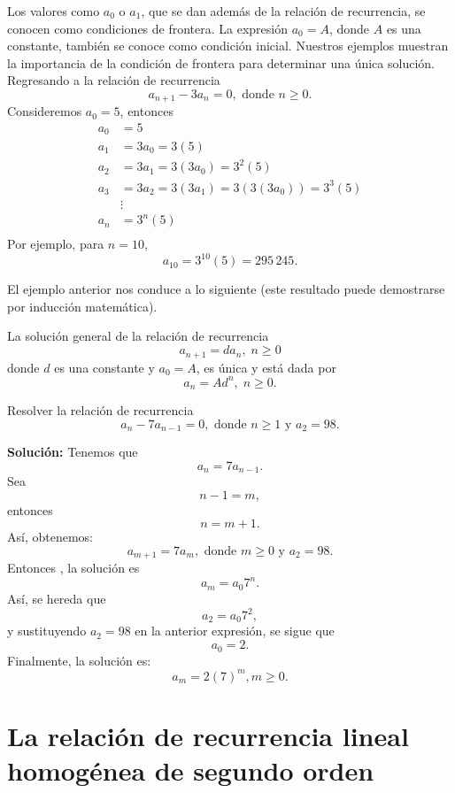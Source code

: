 Los valores como $a_0$ o $a_1$, que se dan además de la relación de recurrencia, se conocen como condiciones de frontera. La expresión $a_0 = A$, donde $A$ es una constante, también se conoce como condición inicial. Nuestros ejemplos muestran la importancia de la condición de frontera para determinar una única solución. \\

Regresando a la relación de recurrencia
$$a_{n+1} - 3a_n = 0, \text{ donde } n \geq 0.$$
Consideremos $a_0 = 5$, entonces
\begin{align*}
    a_0 & = 5 \\
    a_1 & = 3a_0 = 3(5) \\
    a_2 & = 3a_1 = 3(3a_0) = 3^2 (5) \\
    a_3 & = 3a_2 = 3(3a_1) = 3(3(3a_0)) = 3^{3} (5) \\
    & \vdots \\
    a_n & = 3^{n} (5) \\
\end{align*}
Por ejemplo, para $n = 10$,
$$a_{10} = 3^{10}(5) = 295 \, 245.$$

El ejemplo anterior nos conduce a lo siguiente (este resultado puede demostrarse por inducción matemática).

\begin{BOX}
    La solución general de la relación de recurrencia
    $$a_{n+1} = da_n, \; n \geq 0$$
    donde $d$ es una constante y $a_0 = A$, es única y está dada por
    $$a_n = Ad^n, \; n \geq 0.$$
\end{BOX}

\begin{myexample}
    Resolver la relación de recurrencia
    $$a_n - 7a_{n-1} = 0, \text{ donde } n \geq 1 \text{ y } a_2 = 98.$$

    \tcblower
    \textbf{\color{jblueleft}Solución:} Tenemos que
    $$a_n = 7a_{n-1}.$$
    Sea
    $$n - 1 = m,$$
    entonces
    $$n = m + 1.$$
    Así, obtenemos:
    $$a_{m+1} = 7a_m, \text{ donde } m \geq 0 \text{ y } a_2 = 98.$$
    Entonces , la solución es
    $$a_m = a_0 7^{n}.$$
    Así, se hereda que
    $$a_2 = a_0 7^{2},$$
    y sustituyendo $a_2 = 98$ en la anterior expresión, se sigue que
    $$a_0 = 2.$$
    Finalmente, la solución es:
    $$a_m = 2(7)^{m}, m \geq 0.$$
\end{myexample}

\section{La relación de recurrencia lineal homogénea de segundo orden}

